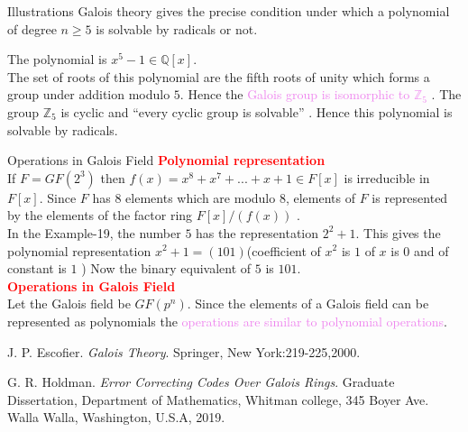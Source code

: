 \begin{frame}[allowframebreaks]{Illustrations}
  Galois theory gives the precise condition under which a polynomial of degree \(n \geq 5\) is solvable by radicals or not.

  \vspace{7mm}
   \begin{tcolorbox}[colback=white, colframe=brown!80!black, boxsep=3mm, title={\bfseries \color{white} Example}]
  The polynomial is \textcolor{green!50!black}{\(x^5-1 \in \mathbb{Q}[x]\)}.\\
  The set of  roots of this polynomial are the fifth roots of unity which forms a group under addition modulo \(5\). Hence the \textcolor{violet}{Galois group is isomorphic to \(\mathbb{Z}_5\)} \cite{hunger}. The group \(\mathbb{Z}_5\) is cyclic and ``every cyclic group is solvable'' \cite{galois}. Hence this polynomial is solvable by radicals.
\end{tcolorbox}

\begin{frame}{Operations in Galois Field}
\textcolor{red}{\textbf{Polynomial representation}}\\[2mm]
If \(F=GF(2^3)\) then \textcolor{green!50!black}{\(f(x)=x^8+x^7+...+x+1 \in F[x]\)} is irreducible in \(F[x]\). Since \(F\) has \(8\) elements which are modulo \(8\), elements of \(F\) is represented by the elements of the factor ring \(F[x]/(f(x))\) \cite{aes}. \\[5mm]


In the Example-19, the number \textcolor{green!50!black}{\(5\) has the representation \(2^2+1\). This gives the polynomial representation \(x^2+1=(101)\)}(coefficient of \(x^2\) is \(1\) of \(x\) is \(0\) and of constant is \(1\) ) Now the binary equivalent of \(5\) is \(101\).\\[5mm]

\textcolor{red}{\textbf{Operations in Galois Field}}\\[2mm]
Let the Galois field be \(GF(p^n)\). Since the elements of a Galois field can be represented as polynomials the \textcolor{violet}{ operations are similar to polynomial operations}.




 \begin{thebibliography}{9}

    J. P. Escofier. \emph{Galois Theory}. Springer, New York:219-225,2000.

    G. R. Holdman. \emph{Error Correcting Codes  Over Galois Rings}. Graduate Dissertation, Department of Mathematics, Whitman college, 345 Boyer Ave.
    Walla Walla, Washington, U.S.A, 2019.


\end{thebibliography}
\end{frame}
\end{frame}
